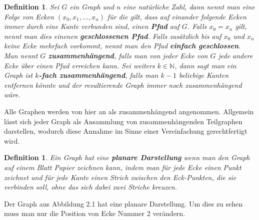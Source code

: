 \documentclass[11pt,a4paper,leqno]{report}
\newtheorem{definition}[theorem]{Definition}
\numberwithin{equation}{chapter}
\begin{document}
\begin{definition}
	Sei $G$ ein Graph und $n$ eine nat\"urliche Zahl, dann nennt man eine Folge von Ecken $(x_0, x_1,\dots,x_n)$ f\"ur die gilt, dass auf einander folgende Ecken immer durch eine Kante verbunden sind, einen \textbf{Pfad} auf $G$. Falls $x_0 = x_n$ gilt, nennt man dies einenen \textbf{geschlossenen Pfad}. Falls zus\"atzlich bis auf $x_0$ und $x_n$ keine Ecke mehrfach vorkommt, nennt man den Pfad \textbf{einfach geschlossen}.\\
	Man nennt $G$ \textbf{zusammenh\"angend}, falls man von jeder Ecke von $G$ jede andere Ecke \"uber einen Pfad erreichen kann. Sei weiters $k\in\mathbb{N}$, dann sagt man ein Graph ist \textbf{$k$-fach zusammen\-h\"angend}, falls man $k - 1$ beliebige Kanten entfernen k\"onnte und der resultierende Graph immer noch zusammenh\"angend w\"are.
\end{definition}
\noindent
Alle Graphen werden von hier an als zusammenh\"angend angenommen. Allgemein l\"asst sich jeder Graph als Ansammlung von zusammenh\"angenden Teilgraphen darstellen, wodurch diese Annahme im Sinne einer Vereinfachung gerechtfertigt wird.
\begin{definition}
	Ein Graph hat eine \textbf{planare Darstellung} wenn man den Graph auf einem Blatt Papier zeichnen kann, indem man f\"ur jede Ecke einen Punkt zeichnet und f\"ur jede Kante einen Strich zwischen den Eck-Punkten, die sie verbinden soll, ohne das sich dabei zwei Striche kreuzen.
\end{definition}
\noindent
	Der Graph aus Abbildung 2.1 hat eine planare Darstellung. Um dies zu sehen muss man nur die Position von Ecke Nummer 2 ver\"andern.
\end{document}
